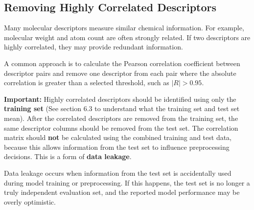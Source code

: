 \documentclass[11pt]{report}
\newenvironment{Important note}{\begin{quote}\color{red}\textbf{Important note:} }{\end{quote}}
\begin{document}
\subsection{Removing Highly Correlated Descriptors}

Many molecular descriptors measure similar chemical information. For example, molecular weight and atom count are often strongly related. If two descriptors are highly correlated, they may provide redundant information.

A common approach is to calculate the Pearson correlation coefficient between descriptor pairs and remove one descriptor from each pair where the absolute correlation is greater than a selected threshold, such as $|R| > 0.95$.

\textbf{Important:} Highly correlated descriptors should be identified using only the \textbf{training set} (See section 6.3 to understand what the training set and test set mean). After the correlated descriptors are removed from the training set, the same descriptor columns should be removed from the test set. The correlation matrix should \textbf{not} be calculated using the combined training and test data, because this allows information from the test set to influence preprocessing decisions. This is a form of \textbf{data leakage}.

Data leakage occurs when information from the test set is accidentally used during model training or preprocessing. If this happens, the test set is no longer a truly independent evaluation set, and the reported model performance may be overly optimistic.
\end{document}
